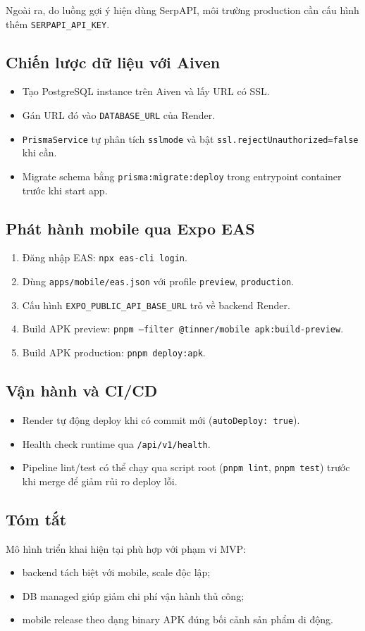 Ngoài ra, do luồng gợi ý hiện dùng SerpAPI, môi trường production cần cấu hình thêm \texttt{SERPAPI\_API\_KEY}.

\subsection{Chiến lược dữ liệu với Aiven}

\begin{itemize}
  \item Tạo PostgreSQL instance trên Aiven và lấy URL có SSL.
  \item Gán URL đó vào \texttt{DATABASE\_URL} của Render.
  \item \texttt{PrismaService} tự phân tích \texttt{sslmode} và bật \texttt{ssl.rejectUnauthorized=false} khi cần.
  \item Migrate schema bằng \texttt{prisma:migrate:deploy} trong entrypoint container trước khi start app.
\end{itemize}

\subsection{Phát hành mobile qua Expo EAS}

\begin{enumerate}
  \item Đăng nhập EAS: \texttt{npx eas-cli login}.
  \item Dùng \texttt{apps/mobile/eas.json} với profile \texttt{preview}, \texttt{production}.
  \item Cấu hình \texttt{EXPO\_PUBLIC\_API\_BASE\_URL} trỏ về backend Render.
  \item Build APK preview: \texttt{pnpm --filter @tinner/mobile apk:build-preview}.
  \item Build APK production: \texttt{pnpm deploy:apk}.
\end{enumerate}

\subsection{Vận hành và CI/CD}

\begin{itemize}
  \item Render tự động deploy khi có commit mới (\texttt{autoDeploy: true}).
  \item Health check runtime qua \texttt{/api/v1/health}.
  \item Pipeline lint/test có thể chạy qua script root (\texttt{pnpm lint}, \texttt{pnpm test}) trước khi merge để giảm rủi ro deploy lỗi.
\end{itemize}

\subsection{Tóm tắt}

Mô hình triển khai hiện tại phù hợp với phạm vi MVP:
\begin{itemize}
  \item backend tách biệt với mobile, scale độc lập;
  \item DB managed giúp giảm chi phí vận hành thủ công;
  \item mobile release theo dạng binary APK đúng bối cảnh sản phẩm di động.
\end{itemize}

